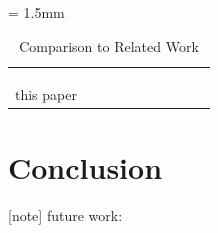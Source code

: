 \documentclass{sig-alternate-05-2015}
\begin{document}
\renewcommand{\arraystretch}{2.0}
\begin{table}[t]
  \caption{\label{tb:comparison_relatedwork}
    Comparison to Related Work}
  \centering
  \scriptsize	                    %
  \tabcolsep = 1.5mm              %
  \begin{tabular}{c|ccccccccc}
    \hline
    &  &  &  &  &  & \\
    \hline
    \hline
    \cite{saidi2015shift} &  &  &  &  &  & \\
    \cite{perret2016mapping} &  &  &  &  &  & \\
    \cite{becker2016contention} &  &  &  &  &  & \\
    this paper &  &  &  &  &  & \\
    \hline
  \end{tabular}
  \vspace{-5mm}
\end{table}


\section{Conclusion}
\label{sec:conclusion}

[note]
future work: \cite{maruyama2016ros2}



\end{document}
